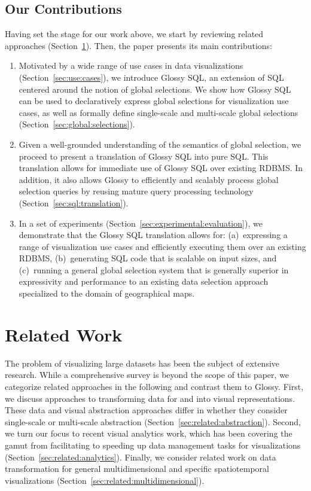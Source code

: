 \documentclass[11pt, oneside]{report}
\begin{document}
\subsection{Our Contributions}

Having set the stage for our work above, we start by reviewing related approaches (Section~\ref{sec:glossy:related:work}). Then, the paper presents its main contributions:

\begin{enumerate}

\item Motivated by a wide range of use cases in data visualizations (Section~\ref{sec:use:cases}), we introduce Glossy SQL, an extension of SQL centered around the notion of global selections. We show how Glossy SQL can be used to declaratively express global selections for visualization use cases, as well as formally define single-scale and multi-scale global selections (Section~\ref{sec:global:selections}).  

\item Given a well-grounded understanding of the semantics of global selection, we proceed to present a translation of Glossy SQL into pure SQL. This translation allows for immediate use of Glossy SQL over existing RDBMS. In addition, it also allows Glossy to efficiently and scalably process global selection queries by reusing mature query processing technology (Section~\ref{sec:sql:translation}). 

\item In a set of experiments (Section~\ref{sec:experimental:evaluation}), we demonstrate that the Glossy SQL translation allows for: (a)~expressing a range of visualization use cases and efficiently executing them over an existing RDBMS, (b)~generating SQL code that is scalable on input sizes, and (c)~running a general global selection system that is generally superior in expressivity and performance to an existing data selection approach specialized to the domain of geographical maps. 

\end{enumerate} 

\section{Related Work}
\label{sec:glossy:related:work}

The problem of visualizing large datasets has been the subject of extensive research. While a comprehensive survey is beyond the scope of this paper, we categorize related approaches in the following and contrast them to Glossy. First, we discuss approaches to transforming data for and into visual representations. These data and visual abstraction approaches differ in whether they consider single-scale or multi-scale abstraction (Section~\ref{sec:related:abstraction}). Second, we turn our focus to recent visual analytics work, which has been covering the gamut from facilitating to speeding up data management tasks for visualizations (Section~\ref{sec:related:analytics}). Finally, we consider related work on data transformation for general multidimensional and specific spatiotemporal visualizations (Section~\ref{sec:related:multidimensional}). 
\end{document}
